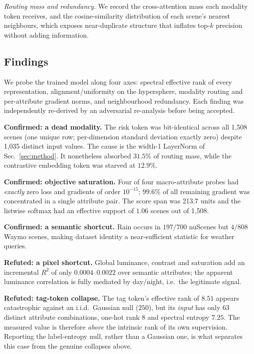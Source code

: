 \documentclass[10pt,twocolumn,letterpaper]{article}
\begin{document}
\noindent\emph{Routing mass and redundancy.} We record the cross-attention
mass each modality token receives, and the cosine-similarity distribution of
each scene's nearest neighbours, which exposes near-duplicate structure that
inflates top-$k$ precision without adding information.

\subsection{Findings}
We probe the trained model along four axes: spectral effective rank of
every representation, alignment/uniformity on the hypersphere, modality
routing and per-attribute gradient norms, and neighbourhood redundancy.
Each finding was independently re-derived by an adversarial re-analysis
before being accepted.

\noindent\textbf{Confirmed: a dead modality.} The risk token was
bit-identical across all 1{,}508 scenes (one unique row; per-dimension
standard deviation exactly zero) despite 1{,}035 distinct input values.
The cause is the width-1 LayerNorm of Sec.~\ref{sec:method}. It
nonetheless absorbed $31.5\%$ of routing mass, while the contrastive
embedding token was starved at $12.9\%$.

\noindent\textbf{Confirmed: objective saturation.} Four of four
macro-attribute probes had \emph{exactly} zero loss and gradients of order
$10^{-15}$; $99.6\%$ of all remaining gradient was concentrated in a
single attribute pair. The score span was 213.7 units and the listwise
softmax had an effective support of $1.06$ scenes out of 1{,}508.

\noindent\textbf{Confirmed: a semantic shortcut.} Rain occurs in $197/700$
nuScenes but $4/808$ Waymo scenes, making dataset identity a near-sufficient
statistic for weather queries.

\noindent\textbf{Refuted: a pixel shortcut.} Global luminance, contrast
and saturation add an incremental $R^2$ of only $0.0004$--$0.0022$ over
semantic attributes; the apparent luminance correlation is fully mediated
by day/night, i.e.\ the legitimate signal.

\noindent\textbf{Refuted: tag-token collapse.} The tag token's effective
rank of $8.51$ appears catastrophic against an i.i.d.\ Gaussian null
($250$), but its \emph{input} has only 63 distinct attribute
combinations, one-hot rank 8 and spectral entropy $7.25$. The measured
value is therefore \emph{above} the intrinsic rank of its own supervision.
Reporting the label-entropy null, rather than a Gaussian one, is what
separates this case from the genuine collapses above.
\end{document}
